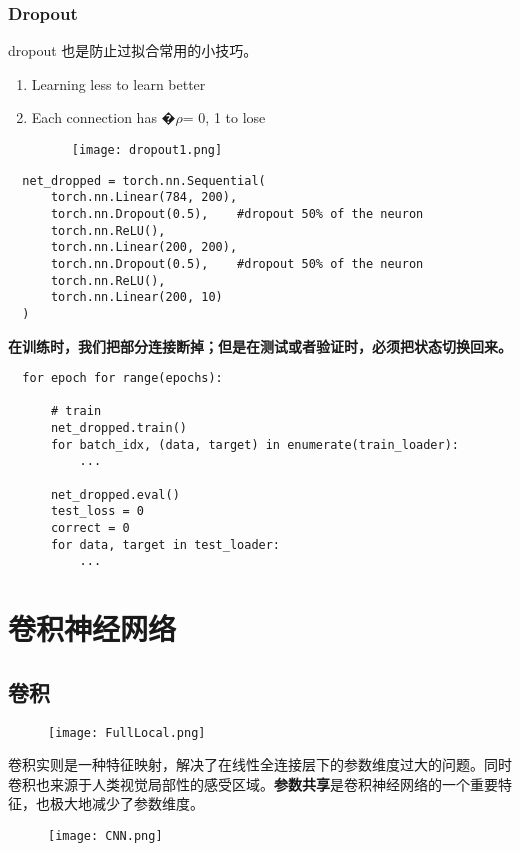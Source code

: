 \subsubsection{Dropout}
dropout 也是防止过拟合常用的小技巧。
\begin{enumerate}
  \item Learning less to learn better
  \item Each connection has �$\rho$= 0, 1 to lose
\begin{figure}[!h]
  \centering
  \texttt{[image: dropout1.png]}
\end{figure}
\end{enumerate}
\begin{lstlisting}
  net_dropped = torch.nn.Sequential(
      torch.nn.Linear(784, 200),
      torch.nn.Dropout(0.5),    #dropout 50% of the neuron
      torch.nn.ReLU(),
      torch.nn.Linear(200, 200),
      torch.nn.Dropout(0.5),    #dropout 50% of the neuron
      torch.nn.ReLU(),
      torch.nn.Linear(200, 10)
  )
\end{lstlisting}

\textbf{在训练时，我们把部分连接断掉；但是在测试或者验证时，必须把状态切换回来。}
\begin{lstlisting}
  for epoch for range(epochs):

      # train
      net_dropped.train()
      for batch_idx, (data, target) in enumerate(train_loader):
          ...

      net_dropped.eval()
      test_loss = 0
      correct = 0
      for data, target in test_loader:
          ...
\end{lstlisting}


\newpage
\section{卷积神经网络}
\subsection{卷积}
\begin{figure}[!h]
  \centering
  \texttt{[image: FullLocal.png]}
\end{figure}
卷积实则是一种特征映射，解决了在线性全连接层下的参数维度过大的问题。同时卷积也来源于人类视觉局部性的感受区域。\textbf{参数共享}是卷积神经网络的一个重要特征，也极大地减少了参数维度。
\begin{figure}[!h]
  \centering
  \texttt{[image: CNN.png]}
\end{figure}

